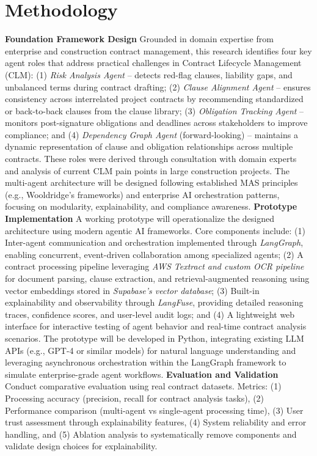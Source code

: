 
\section{Methodology}\label{section:methodology}


\textbf{Foundation Framework Design}  
Grounded in domain expertise from enterprise and construction contract management, this research identifies four key agent roles that address practical challenges in Contract Lifecycle Management (CLM):  
(1) \textit{Risk Analysis Agent} – detects red-flag clauses, liability gaps, and unbalanced terms during contract drafting;  
(2) \textit{Clause Alignment Agent} – ensures consistency across interrelated project contracts by recommending standardized or back-to-back clauses from the clause library;  
(3) \textit{Obligation Tracking Agent} – monitors post-signature obligations and deadlines across stakeholders to improve compliance; and  
(4) \textit{Dependency Graph Agent} (forward-looking) – maintains a dynamic representation of clause and obligation relationships across multiple contracts.  
These roles were derived through consultation with domain experts and analysis of current CLM pain points in large construction projects.  
The multi-agent architecture will be designed following established MAS principles (e.g., Wooldridge's frameworks) and enterprise AI orchestration patterns, focusing on modularity, explainability, and compliance awareness.
\newline
\break
\textbf{Prototype Implementation}  
A working prototype will operationalize the designed architecture using modern agentic AI frameworks. Core components include:  
(1) Inter-agent communication and orchestration implemented through \textit{LangGraph}, enabling concurrent, event-driven collaboration among specialized agents;  
(2) A contract processing pipeline leveraging \textit{AWS Textract and custom OCR pipeline} for document parsing, clause extraction, and retrieval-augmented reasoning using vector embeddings stored in \textit{Supabase's vector database};  
(3) Built-in explainability and observability through \textit{LangFuse}, providing detailed reasoning traces, confidence scores, and user-level audit logs; and  
(4) A lightweight web interface for interactive testing of agent behavior and real-time contract analysis scenarios.  
The prototype will be developed in Python, integrating existing LLM APIs (e.g., GPT-4 or similar models) for natural language understanding and leveraging asynchronous orchestration within the LangGraph framework to simulate enterprise-grade agent workflows.
\newline
\break
\textbf{Evaluation and Validation}
Conduct comparative evaluation using real contract datasets. Metrics: (1) Processing accuracy (precision, recall for contract analysis tasks), (2) Performance comparison (multi-agent vs single-agent processing time), (3) User trust assessment through explainability features, (4) System reliability and error handling, and (5) Ablation analysis to systematically remove components and validate design choices for explainability.
\newline
\break
